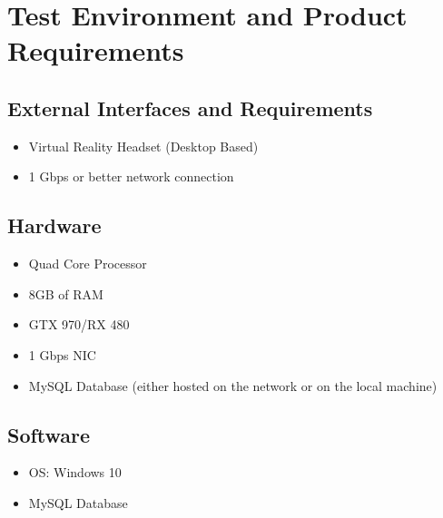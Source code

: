 \documentclass[letterpaper,10pt,english,openany,oneside]{sphinxmanual}
\begin{document}
\section{Test Environment and Product Requirements}
\label{\detokenize{test_plan/test_environment_and_product_requirements:test-environment-and-product-requirements}}\label{\detokenize{test_plan/test_environment_and_product_requirements::doc}}

\subsection{External Interfaces and Requirements}
\label{\detokenize{test_plan/test_environment_and_product_requirements:external-interfaces-and-requirements}}\begin{itemize}
\item {} 
Virtual Reality Headset (Desktop Based)

\item {} 
1 Gbps or better network connection

\end{itemize}


\subsection{Hardware}
\label{\detokenize{test_plan/test_environment_and_product_requirements:hardware}}\begin{itemize}
\item {} 
Quad Core Processor

\item {} 
8GB of RAM

\item {} 
GTX 970/RX 480

\item {} 
1 Gbps NIC

\item {} 
MySQL Database (either hosted on the network or on the local machine)

\end{itemize}


\subsection{Software}
\label{\detokenize{test_plan/test_environment_and_product_requirements:software}}\begin{itemize}
\item {} 
OS: Windows 10

\item {} 
MySQL Database

\end{itemize}
\end{document}
